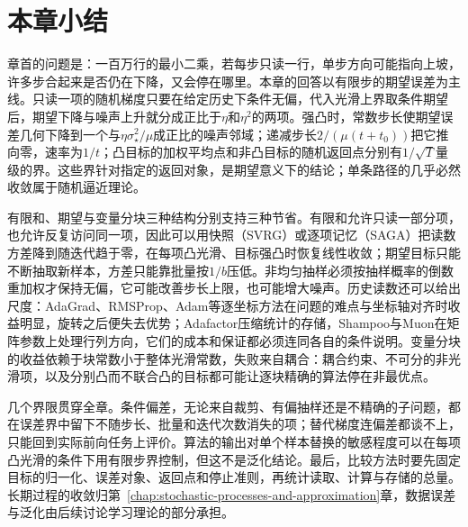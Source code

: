 \section{本章小结}
\label{sec:opt-sto-summary}

章首的问题是：一百万行的最小二乘，若每步只读一行，单步方向可能指向上坡，许多步合起来是否仍在下降，又会停在哪里。本章的回答以有限步的期望误差为主线。只读一项的随机梯度只要在给定历史下条件无偏，代入光滑上界取条件期望后，期望下降与噪声上升就分成正比于$\eta$和$\eta^2$的两项。强凸时，常数步长使期望误差几何下降到一个与$\eta\sigma_\star^2/\mu$成正比的噪声邻域；递减步长$2/(\mu(t+t_0))$把它推向零，速率为$1/t$；凸目标的加权平均点和非凸目标的随机返回点分别有$1/\sqrt T$量级的界。这些界针对指定的返回对象，是期望意义下的结论；单条路径的几乎必然收敛属于随机逼近理论。

有限和、期望与变量分块三种结构分别支持三种节省。有限和允许只读一部分项，也允许反复访问同一项，因此可以用快照（SVRG）或逐项记忆（SAGA）把读数方差降到随迭代趋于零，在每项凸光滑、目标强凸时恢复线性收敛；期望目标只能不断抽取新样本，方差只能靠批量按$1/b$压低。非均匀抽样必须按抽样概率的倒数重加权才保持无偏，它可能改善步长上限，也可能增大噪声。历史读数还可以给出尺度：AdaGrad、RMSProp、Adam等逐坐标方法在问题的难点与坐标轴对齐时收益明显，旋转之后便失去优势；Adafactor压缩统计的存储，Shampoo与Muon在矩阵参数上处理行列方向，它们的成本和保证都必须连同各自的条件说明。变量分块的收益依赖于块常数小于整体光滑常数，失败来自耦合：耦合约束、不可分的非光滑项，以及分别凸而不联合凸的目标都可能让逐块精确的算法停在非最优点。

几个界限贯穿全章。条件偏差，无论来自裁剪、有偏抽样还是不精确的子问题，都在误差界中留下不随步长、批量和迭代次数消失的项；替代梯度连偏差都谈不上，只能回到实际前向任务上评价。算法的输出对单个样本替换的敏感程度可以在每项凸光滑的条件下用有限步界控制，但这不是泛化结论。最后，比较方法时要先固定目标的归一化、误差对象、返回点和停止准则，再统计读取、计算与存储的总量。长期过程的收敛归第~\ref{chap:stochastic-processes-and-approximation}章，数据误差与泛化由后续讨论学习理论的部分承担。
